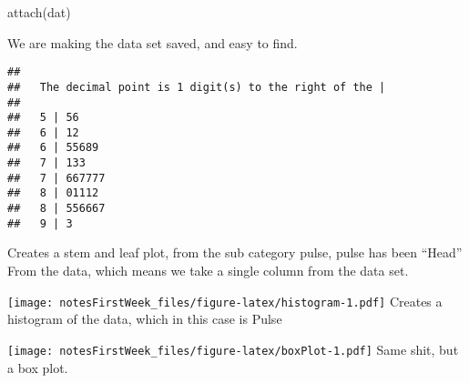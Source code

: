 \documentclass[
]{article}
\newenvironment{Shaded}{\begin{snugshade}}{\end{snugshade}}
\newcommand{\AttributeTok}[1]{\textcolor[rgb]{0.77,0.63,0.00}{#1}}
\newcommand{\ConstantTok}[1]{\textcolor[rgb]{0.00,0.00,0.00}{#1}}
\newcommand{\FunctionTok}[1]{\textcolor[rgb]{0.00,0.00,0.00}{#1}}
\newcommand{\NormalTok}[1]{#1}
\newcommand{\SpecialCharTok}[1]{\textcolor[rgb]{0.00,0.00,0.00}{#1}}
\newcommand{\StringTok}[1]{\textcolor[rgb]{0.31,0.60,0.02}{#1}}
\begin{document}
\begin{Shaded}
\begin{Highlighting}[]
\FunctionTok{attach}\NormalTok{(dat)}
\end{Highlighting}
\end{Shaded}

We are making the data set saved, and easy to find.

\begin{Shaded}
\end{Shaded}

\begin{verbatim}
## 
##   The decimal point is 1 digit(s) to the right of the |
## 
##   5 | 56
##   6 | 12
##   6 | 55689
##   7 | 133
##   7 | 667777
##   8 | 01112
##   8 | 556667
##   9 | 3
\end{verbatim}

Creates a stem and leaf plot, from the sub category pulse, pulse has
been ``Head'' From the data, which means we take a single column from
the data set.

\begin{Shaded}
\end{Shaded}

\texttt{[image: notesFirstWeek\_files/figure-latex/histogram-1.pdf]}
Creates a histogram of the data, which in this case is Pulse

\begin{Shaded}
\end{Shaded}

\texttt{[image: notesFirstWeek\_files/figure-latex/boxPlot-1.pdf]} Same
shit, but a box plot.

\begin{Shaded}
\end{Shaded}
\end{document}

